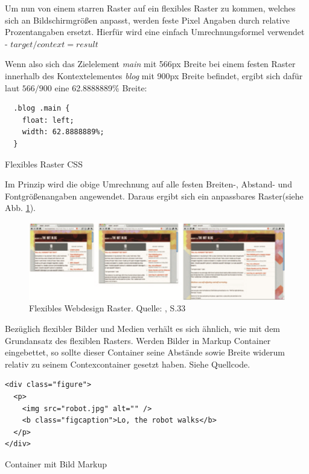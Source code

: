 Um nun von einem starren Raster auf ein flexibles Raster zu kommen, welches sich an Bildschirmgrößen anpasst, werden feste Pixel Angaben durch relative Prozentangaben ersetzt. Hierfür wird eine einfach Umrechnungsformel verwendet - $target / context = result$

Wenn also sich das Zielelement \emph{main} mit 566px Breite bei einem festen Raster innerhalb des Kontextelementes \emph{blog} mit 900px Breite befindet, ergibt sich dafür laut $566 / 900$ eine 62.8888889\% Breite:

\begin{listing}[H]
\begin{verbatim}
  .blog .main {
    float: left;
    width: 62.8888889%;
  }
\end{verbatim}
\caption{Flexibles Raster CSS}
\label{lst:flex_grid_css}
\end{listing}

Im Prinzip wird die obige Umrechnung auf alle festen Breiten-, Abstand- und Fontgrößenangaben angewendet. Daraus ergibt sich ein anpassbares Raster(siehe Abb. \ref{fig:flex_grid}).

\begin{figure}[htp]     %
\centering
\includegraphics[width=1.0\textwidth]{images/flex_grid}
\caption{Flexibles Webdesign Raster. Quelle: \cite{Marcotte:2011}, S.33}\label{fig:flex_grid}
\end{figure}

Bezüglich flexibler Bilder und Medien verhält es sich ähnlich, wie mit dem Grundansatz des flexiblen Rasters. Werden Bilder in Markup Container eingebettet, so sollte dieser Container seine Abstände sowie Breite widerum relativ zu seinem Contexcontainer gesetzt haben. Siehe Quellcode.

\begin{listing}[H]
\begin{verbatim}
<div class="figure">
  <p>
    <img src="robot.jpg" alt="" />
    <b class="figcaption">Lo, the robot walks</b>
  </p>
</div>
\end{verbatim}
\caption{Container mit Bild Markup}
\label{lst:image_container_markup}
\end{listing}

